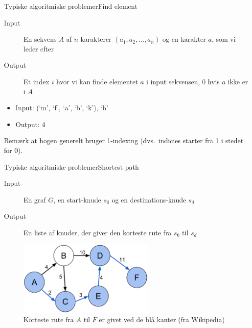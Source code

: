 \documentclass[aspectratio=1610]{beamer}
\begin{document}
\begin{frame}{Typiske algoritmiske problemer}{Find element}

    \begin{description}
        \item[Input] En sekvens $A$ af $n$ karakterer $(a_1, a_2, \ldots, a_n)$
            og en karakter $a$, som vi leder efter
        \item[Output] Et index $i$ hvor vi kan finde elementet $a$ i input
            sekvensen, 0 hvis $a$ ikke er i $A$
    \end{description}

    \pause

    \begin{example}
        \begin{itemize}
            \item Input: (`m', `f', `a', `b', `k'), `b'
            \item Output: 4
        \end{itemize}
    \end{example}

    Bemærk at bogen generelt bruger 1-indexing (dvs.\ indicies starter fra 1
    i stedet for 0).
    
\end{frame}

\begin{frame}{Typiske algoritmiske problemer}{Shortest path}
    \begin{description}
        \item[Input] En graf $G$, en start-knude $s_0$ og en destinations-knude
            $s_d$
        \item[Output] En liste af knuder, der giver den korteste rute fra $s_0$
            til $s_d$
    \end{description}

    \pause
    \begin{figure}[h]
        \centering
        \includegraphics[width=0.6\textwidth]{shortest-path-wiki}
        \caption{%
            Korteste rute fra $A$ til $F$ er givet ved de blå kanter (fra
            Wikipedia)
        }
        \label{fig:shortest-path-wiki}
    \end{figure}
\end{frame}
\end{document}
